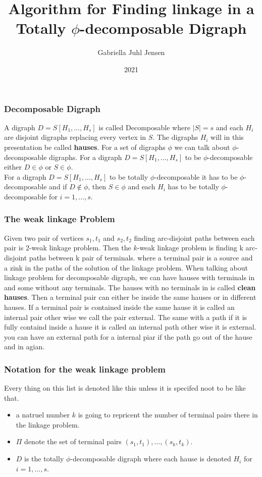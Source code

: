 \documentclass{beamer}
\title{Algorithm for Finding linkage in a Totally $\phi$-decomposable Digraph}
\author{Gabriella Juhl Jensen}
\institute{Jørgen Bang-Jensen}
\date{2021}
\begin{document}
\frame{\titlepage}

\begin{frame}
\frametitle{Decomposable Digraph}
A digraph $D=S[H_1,\dots , H_s]$ is called Decomposable where $|S|=s$ and each $H_i$ are disjoint digraphs replacing every vertex in $S$. 
The digraphs $H_i$ will in this presentation be called \textbf{hauses}.
For a set of digraphs $\phi$ we can talk about $\phi$-decomposable digraphs. 
For a digraph $D=S[H_1,\dots ,H_s]$ to be $\phi$-decomposable either $D\in \phi$ or $S\in \phi$.\\

For a digraph $D=S[H_1,\dots ,H_s]$ to be  totally $\phi$-decomposable it has to be $\phi$-decomposable and if $D\notin \phi$, then $S\in \phi$ and each $H_i$ has to be totally $\phi$-decomposable for $i=1,\dots ,s$.
\end{frame}

\begin{frame}
\frametitle{The weak linkage Problem}
Given two pair of vertices $s_1,t_1$ and $s_2,t_2$ finding arc-disjoint paths between each pair is 2-weak linkage problem. Then the $k$-weak linkage problem is finding k arc-disjoint paths between k pair of terminals.
where a terminal  pair is a source and a zink in the paths of the solution of the linkage problem.
When talking about linkage problem for decomposable digraph, we can have hauses with terminals in and some without any terminals. 
The hauses with no terminals in is called \textbf{clean hauses}.
Then a terminal pair can either be inside the same hauses or in different hauses. If a terminal pair is contained inside the same hause it is called an internal pair other wise we call the pair external.
The same with a path if it is fully containd inside a hause it is called an internal path other wise it is external.
you can have an external path for a internal piar if the path go out of the hause and in agian.
\end{frame}

\begin{frame}
\frametitle{Notation for the weak linkage problem}
Every thing on this list is denoted like this unless it is specifed noot to be like that.
\begin{itemize}
    \item a natruel number $k$ is going to repricent the number of terminal pairs there in the linkage problem.
    \item $\Pi$ denote the set of terminal pairs $(s_1,t_1),\dots ,(s_k,t_k)$.
    \item $D$ is the totally $\phi$-decomposable digraph where each hause is denoted $H_i$ for $i=1,\dots ,s$.
\end{itemize}
\end{frame}
\end{document}
